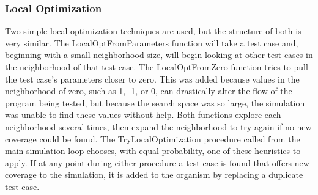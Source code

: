 \documentclass[runningheads]{llncs}
\begin{document}
\begin{comment}
\begin{figure}[h!]
	\begin{center}
		\hrule
		\medskip
		\begin{Verbatim}[fontfamily=tt, xleftmargin=10pt, commandchars=\\\{\},
		codes={\catcode`$=3\catcode`^=7\catcode`_=8}]
$\hbox{TestSuiteMutation}(P_m)$  
   for (i = 0 : numberOfTestCases) 
      if (toss < $P_m$) 
         Build new test case from most useful ranges, store in $tc$
         if ($tc$ covers anything new) 
            Replace a duplicate test case with $tc$
   end for
		\end{Verbatim}
		\hrule
	\end{center}
	\caption{Algorithm for test suite mutation \label{fig:tcCfross}}
\end{figure}
\end{comment}


\FloatBarrier
\subsubsection{Local Optimization}

Two simple local optimization techniques are used, but the structure of both is very similar. The LocalOptFromParameters function will take a test case and, beginning with a small neighborhood size, will begin looking at other test cases in the neighborhood of that test case. The LocalOptFromZero function tries to pull the test case's parameters closer to zero. This was added because values in the neighborhood of zero, such as 1, -1, or 0, can drastically alter the flow of the program being tested, but because the search space was so large, the simulation was unable to find these values without help. Both functions explore each neighborhood several times, then expand the neighborhood to try again if no new coverage could be found. The TryLocalOptimization procedure called from the main simulation loop chooses, with equal probability, one of these heuristics to apply. If at any point during either procedure a test case is found that offers new coverage to the simulation, it is added to the organism by replacing a duplicate test case.
\end{document}
